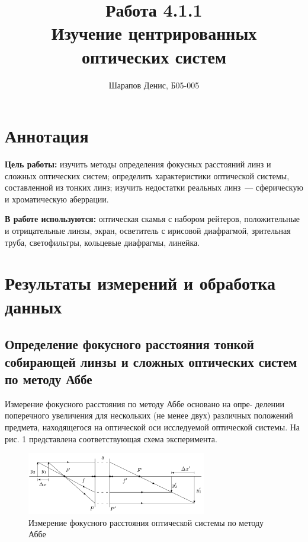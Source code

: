 \documentclass[a4paper]{article}
\title{Работа 4.1.1 \\ Изучение центрированных оптических систем}
\author{Шарапов Денис, Б05-005}
\date{}
\begin{document}
    \maketitle
    \tableofcontents
    \newpage
    
\section{Аннотация}

\noindent\textbf{Цель работы:} изучить методы определения фокусных расстояний линз и сложных оптических систем; определить характеристики оптической системы, составленной из тонких линз; изучить недостатки реальных линз~--- сферическую и хроматическую аберрации. \smallskip
 
\noindent \textbf{В работе используются:} оптическая скамья с набором рейтеров, положительные и отрицательные линзы, экран, осветитель с ирисовой диафрагмой, зрительная труба, светофильтры, кольцевые диафрагмы, линейка.

\section{Результаты измерений и обработка данных}

\subsection{Определение фокусного расстояния тонкой собирающей линзы и сложных оптических систем по методу Аббе}

Измерение фокусного расстояния по методу Аббе основано на опре-
делении поперечного увеличения для нескольких (не менее двух) различных положений предмета, находящегося на оптической оси исследуемой оптической системы. На рис. 1 представлена соответствующая
схема эксперимента.

\begin{figure}[ht!]
    \centering
    \includegraphics[width = 0.7\textwidth]{image/pic1.png}
    \caption{Измерение фокусного расстояния оптической
    системы по методу Аббе}
\end{figure}
\end{document}
